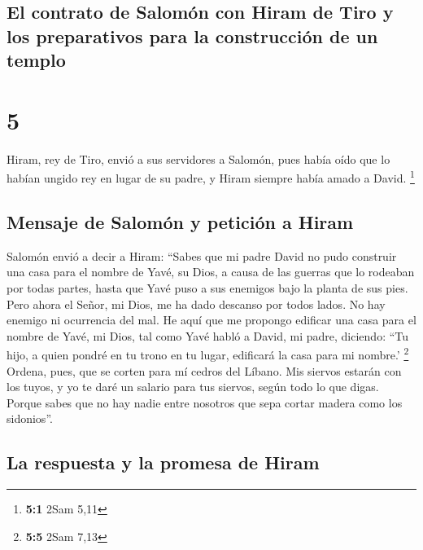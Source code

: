 \hypertarget{el-contrato-de-salomuxf3n-con-hiram-de-tiro-y-los-preparativos-para-la-construcciuxf3n-de-un-templo}{%
\subsection{El contrato de Salomón con Hiram de Tiro y los preparativos
para la construcción de un
templo}\label{el-contrato-de-salomuxf3n-con-hiram-de-tiro-y-los-preparativos-para-la-construcciuxf3n-de-un-templo}}

\hypertarget{section-4}{%
\section{5}\label{section-4}}

 Hiram, rey de Tiro, envió a sus servidores a Salomón,
pues había oído que lo habían ungido rey en lugar de su padre, y Hiram
siempre había amado a David. \footnote{\textbf{5:1} 2Sam 5,11}

\hypertarget{mensaje-de-salomuxf3n-y-peticiuxf3n-a-hiram}{%
\subsection{Mensaje de Salomón y petición a
Hiram}\label{mensaje-de-salomuxf3n-y-peticiuxf3n-a-hiram}}

 Salomón envió a decir a Hiram:  ``Sabes que
mi padre David no pudo construir una casa para el nombre de Yavé, su
Dios, a causa de las guerras que lo rodeaban por todas partes, hasta que
Yavé puso a sus enemigos bajo la planta de sus pies.  Pero
ahora el Señor, mi Dios, me ha dado descanso por todos lados. No hay
enemigo ni ocurrencia del mal.  He aquí que me propongo
edificar una casa para el nombre de Yavé, mi Dios, tal como Yavé habló a
David, mi padre, diciendo: ``Tu hijo, a quien pondré en tu trono en tu
lugar, edificará la casa para mi nombre.' \footnote{\textbf{5:5} 2Sam
  7,13}  Ordena, pues, que se corten para mí cedros del
Líbano. Mis siervos estarán con los tuyos, y yo te daré un salario para
tus siervos, según todo lo que digas. Porque sabes que no hay nadie
entre nosotros que sepa cortar madera como los sidonios''.

\hypertarget{la-respuesta-y-la-promesa-de-hiram}{%
\subsection{La respuesta y la promesa de
Hiram}\label{la-respuesta-y-la-promesa-de-hiram}}

